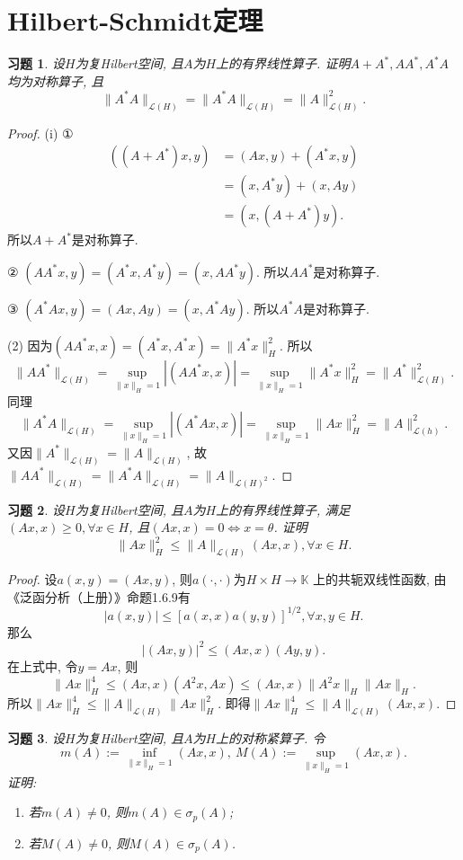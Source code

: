 \documentclass[UTF8,twoside]{ctexbook}
\newtheorem{exercise}{习题}[section]
\newcommand{\h}{\mathscr}
\newcommand{\kx}{\mathbb}
\numberwithin{equation}{section}
\begin{document}
	\section{Hilbert-Schmidt定理}
	\begin{exercise}
		设$H$为复Hilbert空间, 且$A$为$H$上的有界线性算子. 证明$A+A^*,AA^*,A^*A$均为对称算子, 且
		\[
		\|A^*A\|_{\h L(H)}=\|A^*A\|_{\h L(H)}=\|A\|^2_{\h L(H)}.
		\]
	\end{exercise}
	\begin{proof}
		(i) ①
		\[
		\begin{aligned}
		((A+A^*)x,y)&=(Ax,y)+(A^*x,y)\\
		&=(x,A^*y)+(x,Ay)\\
		&=(x,(A+A^*)y).
		\end{aligned}
		\]
		所以$A+A^*$是对称算子.

		② $(AA^*x,y)=(A^*x,A^*y)=(x,AA^*y)$. 所以$AA^*$是对称算子.

		③ $(A^*Ax,y)=(Ax,Ay)=(x,A^*Ay)$. 所以$A^*A$是对称算子.

		(2) 因为$(AA^*x,x)=(A^*x,A^*x)=\|A^*x\|_{H}^2$. 所以
		\[
		\|AA^*\|_{\h L(H)}=\sup_{\|x\|_H=1}|(AA^*x,x)|=\sup_{\|x\|_H=1}\|A^*x\|_H^2=\|A^*\|_{\h L(H)}^2.
		\]
		同理
		\[
		\|A^*A\|_{\h L(H)}=\sup_{\|x\|_H=1}|(A^*Ax,x)|=\sup_{\|x\|_H=1}\|Ax\|_H^2=\|A\|_{\h L(h)}^2.
		\]
		又因$\|A^*\|_{\h L(H)}=\|A\|_{\h L(H)}$, 故$\|AA^*\|_{\h L(H)}=\|A^*A\|_{\h L(H)}=\|A\|_{\h L(H)^2}$.
	\end{proof}
	\begin{exercise}
		设$H$为复Hilbert空间, 且$A$为$H$上的有界线性算子, 满足$(Ax,x)\geq 0,\forall x\in H$, 且$(Ax,x)=0\Leftrightarrow x=\theta$. 证明
		\[
		\|Ax\|_H^2\leq \|A\|_{\h L(H)}(Ax,x),\forall x\in H.
		\]
	\end{exercise}
	\begin{proof}
		设$a(x,y)=(Ax,y)$, 则$a(\cdot,\cdot)$为$H\times H\rightarrow \kx K$ 上的共轭双线性函数, 由《泛函分析（上册）》命题1.6.9有
		\[
		|a(x,y)|\leq [a(x,x)a(y,y)]^{1/2}, \forall x,y\in H.
		\]
		那么
		\[
		|(Ax,y)|^2\leq(Ax,x)(Ay,y).
		\]
		在上式中, 令$y=Ax$, 则
		\[
		\|Ax\|_H^4\leq (Ax,x)(A^2x,Ax)
		\leq (Ax,x)\|A^2x\|_H \|Ax\|_H.
		\]
		所以$\|Ax\|_H^4\leq \|A\|_{\h L(H)}\|Ax\|_H^2$. 即得$\|Ax\|_H^4\leq \|A\|_{\h L(H)}(Ax,x)$.
	\end{proof}
	\begin{exercise}
		设$H$为复Hilbert空间, 且$A$为$H$上的对称紧算子. 令
		\[
		m(A):=\inf_{\|x\|_H=1}(Ax,x),\ M(A):=\sup_{\|x\|_H=1}(Ax,x).
		\]
		证明:
		\begin{enumerate}[(1)]
			\item 若$m(A)\neq0$, 则$m(A)\in\sigma_p(A)$;
			\item 若$M(A)\neq0$, 则$M(A)\in\sigma_p(A)$.
		\end{enumerate}
	\end{exercise}
\end{document}
